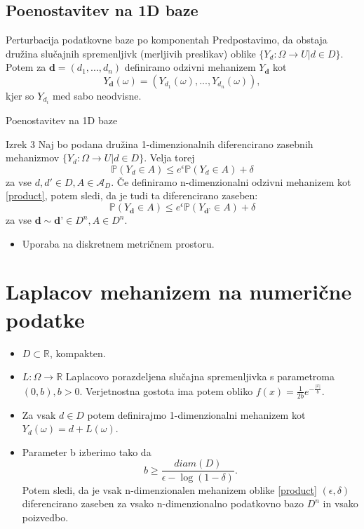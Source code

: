 \documentclass{beamer}
\begin{document}
\subsection{Poenostavitev na 1D baze}
\begin{frame}{Perturbacija podatkovne baze po komponentah}
Predpostavimo, da obstaja družina slučajnih spremenljivk (merljivih preslikav) oblike $\{ Y_d: \Omega \rightarrow U | d \in D\}$.  Potem za $\textbf{d} = (d_1,...,d_n)$ definiramo odzivni mehanizem $Y_{\textbf{d}}$ kot  
\begin{equation}\label{product}
Y_{\textbf{d}} (\omega) = (Y_{d_1} (\omega) , ... , Y_{d_n} (\omega)), \tag{5}
\end{equation}
kjer so $Y_{d_i}$ med sabo neodvisne.
\end{frame}

\begin{frame}{Poenostavitev na 1D baze}
\begin{block}{Izrek 3}
Naj bo podana družina 1-dimenzionalnih diferencirano zasebnih mehanizmov $\{ Y_d: \Omega \rightarrow U | d \in D\}$. Velja torej
$$\mathbb{P}(Y_d \in A) \leq e^\epsilon \mathbb{P}(Y_d \in A) + \delta$$ 
za vse $d,d' \in D, A \in \mathcal{A}_D$. Če definiramo n-dimenzionalni odzivni mehanizem kot \eqref{product}, potem sledi, da je tudi ta diferencirano zaseben:
$$\mathbb{P}(Y_{\textbf{d}} \in A) \leq e^\epsilon \mathbb{P}(Y_{\textbf{d'}} \in A) + \delta$$
za vse $\textbf{d} \sim \textbf{d'} \in D^n, A \in D^n$.
\end{block}
\begin{itemize}
\item Uporaba na diskretnem metričnem prostoru.
\end{itemize}
\end{frame}

\section{Laplacov mehanizem na numerične podatke}
\begin{frame}
\begin{itemize}
\item  $D \subset \mathbb{R}$, kompakten. 
\item $L: \Omega \rightarrow \mathbb{R}$ Laplacovo porazdeljena slučajna spremenljivka s parametroma $(0,b), b > 0$. 
Verjetnostna gostota ima potem obliko $f(x)=\frac{1}{2b}e^{-\frac{|x|}{b}}$.  
\item Za vsak $d \in D$ potem definirajmo 1-dimenzionalni mehanizem kot  $Y_{d}(\omega) = d + L(\omega)$. 
\item Parameter b izberimo tako da 
$$b\geq \frac{diam(D)}{\epsilon - \log(1-\delta)}.$$
Potem sledi, da je vsak n-dimenzionalen mehanizem oblike \eqref{product} $(\epsilon, \delta)$ diferencirano zaseben za vsako n-dimenzionalno podatkovno bazo $D^n$ in vsako poizvedbo. 
\end{itemize}
\end{frame}
\end{document}
